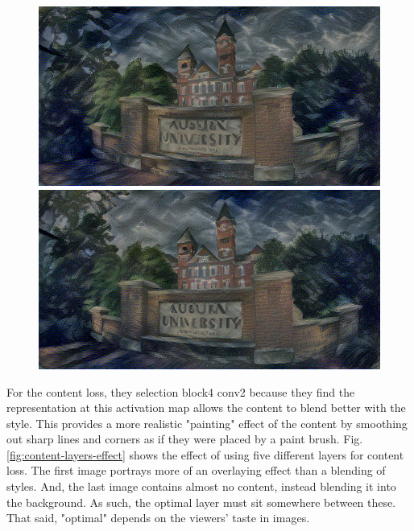 \documentclass{article}
\begin{document}
\begin{figure}
\medskip

    \begin{minipage}{0.3\linewidth}
    \includegraphics[width=\textwidth]{img/style-layer-selection/block4_conv1}
    \end{minipage}
    \begin{minipage}{0.3\linewidth}
    \includegraphics[width=\textwidth]{img/style-layer-selection/block5_conv1}
    \end{minipage}

\end{figure}

For the content loss, they selection block4 conv2 because they find the
representation at this activation map allows the content to blend better with
the style. This provides a more realistic "painting" effect of the content by
smoothing out sharp lines and corners as if they were placed by a paint brush.
Fig. \ref{fig:content-layers-effect} shows the effect of using five different
layers for content loss. The first image portrays more of an overlaying effect
than a blending of styles. And, the last image contains almost no content,
instead blending it into the background. As such, the optimal layer must sit
somewhere between these. That said, "optimal" depends on the viewers' taste in
images.
\end{document}
